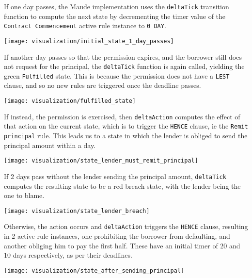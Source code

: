 \documentclass{article}
\begin{document}
If one day passes, the Maude implementation uses the \texttt{deltaTick}
transition function to compute the next state by decrementing the timer value
of the \texttt{Contract Commencement} active rule instance to \texttt{0 DAY}.

\texttt{[image: visualization/initial\_state\_1\_day\_passes]}

If another day passes so that the permission expires, and the borrower still
does not request for the principal, the \texttt{deltaTick} function is again
called, yielding the green \texttt{Fulfilled} state.
This is because the permission does not have a \texttt{LEST} clause, and so
no new rules are triggered once the deadline passes.

\texttt{[image: visualization/fulfilled\_state]}

If instead, the permission is exercised, then \texttt{deltaAction} computes
the effect of that action on the current state, which is to trigger the
\texttt{HENCE} clause, ie the \texttt{Remit principal} rule.
This leads us to a state in which the lender is obliged to send the principal
amount within a day.

\texttt{[image: visualization/state\_lender\_must\_remit\_principal]}

If 2 days pass without the lender sending the principal amount,
\texttt{deltaTick} computes the resulting state to be a red breach state, with
the lender being the one to blame.

\texttt{[image: visualization/state\_lender\_breach]}

Otherwise, the action occurs and \texttt{deltaAction} triggers the
\texttt{HENCE} clause, resulting in 2
active rule instances, one prohibiting the borrower from defaulting,
and another obliging him to pay the first half.
These have an initial timer of 20 and 10 days respectively, as per their
deadlines.

\texttt{[image: visualization/state\_after\_sending\_principal]}

\end{document}
